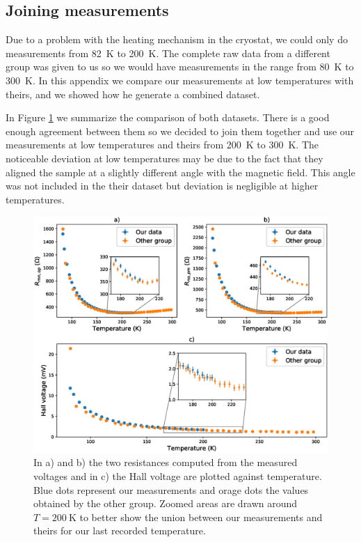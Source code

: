 \documentclass[11pt,a4paper]{article}
\begin{document}
\newpage
\begin{appendices}
\section{Joining measurements}\label{app:dataset}
Due to a problem with the heating mechanism in the cryostat, we could only do measurements from \SI{82}{\kelvin} to \SI{200}{\kelvin}. The complete raw data from a different group was given to us so we would have measurements in the range from \SI{80}{\kelvin} to \SI{300}{\kelvin}. In this appendix we compare our measurements at low temperatures with theirs, and we showed how he generate a combined dataset.

In Figure \ref{fig:comparison_datasets} we summarize the comparison of both datasets. There is a good enough agreement between them so we decided to join them together and use our measurements at low temperatures and theirs from \SI{200}{\kelvin} to \SI{300}{\kelvin}. The noticeable deviation at low temperatures may be due to the fact that they aligned the sample at a slightly different angle with the magnetic field. This angle was not included in the their dataset but deviation is negligible at higher temperatures.

\begin{figure}[H]
\centering
\includegraphics[width=\textwidth]{comparison_datasets.eps}
\caption{In a) and b) the two resistances computed from the measured voltages and in c) the Hall voltage are plotted against temperature. Blue dots represent our measurements and orage dots the values obtained by the other group. Zoomed areas are drawn around $T=\SI{200}{\kelvin}$ to better show the union between our measurements and theirs for our last recorded temperature.}
\label{fig:comparison_datasets}
\end{figure}


\end{appendices}
\end{document}
